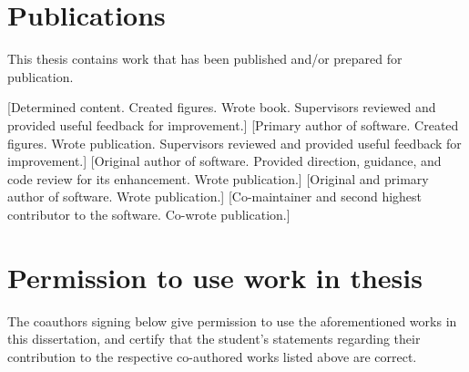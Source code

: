 \documentclass{book}
\begin{document}
\section*{Publications}

This thesis contains work that has been published and/or prepared for publication.






[Determined content. Created figures. Wrote book. Supervisors reviewed and provided useful feedback for improvement.]
[Primary author of software. Created figures. Wrote publication. Supervisors reviewed and provided useful feedback for improvement.]
[Original author of software. Provided direction, guidance, and code review for its enhancement. Wrote publication.]
[Original and primary author of software. Wrote publication.]
[Co-maintainer and second highest contributor to the software. Co-wrote publication.]


\section*{Permission to use work in thesis}
The coauthors signing below give permission to use the aforementioned works
in this dissertation,
and certify that the student's statements regarding their contribution to the respective co-authored works listed above are correct.
\end{document}
